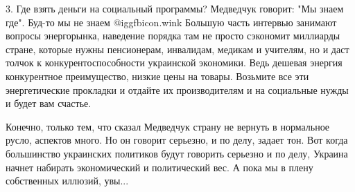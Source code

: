 3. Где взять деньги на социальный программы? Медведчук говорит: "Мы знаем где".
Буд-то мы не знаем  @igg{fbicon.wink}  Большую часть интервью занимают вопросы энергорынка,
наведение порядка там не просто сэкономит миллиарды стране, которые нужны
пенсионерам, инвалидам, медикам и учителям, но и даст толчок к
конкурентоспособности украинской экономики. Ведь дешевая энергия конкурентное
преимущество, низкие цены на товары. Возьмите все эти энергетические прокладки
и отдайте их производителям и на социальные нужды и будет вам счастье.  

Конечно, только тем, что сказал Медведчук страну не вернуть в нормальное русло,
аспектов много. Но он говорит серьезно, и по делу, задает тон. Вот когда
большинство украинских политиков будут говорить серьезно и по делу, Украина
начнет набирать экономический и политический вес. А пока мы в плену собственных
иллюзий, увы...

